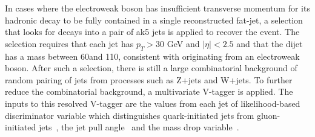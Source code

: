 In cases where the electroweak boson has insufficient transverse momentum for its hadronic
decay to be fully contained in a single reconstructed fat-jet, a selection that looks for decays 
into a pair of ak5 jets is applied to recover the event. 
The selection requires that each jet has $p_T>30$ GeV and $|\eta|<2.5$ and that the dijet has a mass between 60\gev and 110\gev, consistent with originating 
from an electroweak boson.
After such a selection, there is still a large combinatorial background of random
pairing of jets from processes such as Z+jets and W+jets. To further reduce the combinatorial background, a
multivariate V-tagger is applied. The inputs to this resolved V-tagger are the values from each jet of likelihood-based discriminator variable 
which distinguishes quark-initiated jets from gluon-initiated jets~\cite{JME-14-002}, the jet pull angle~\cite{Gallicchio:2010sw} and the mass drop variable~\cite{Izaguirre:2014ira}.

